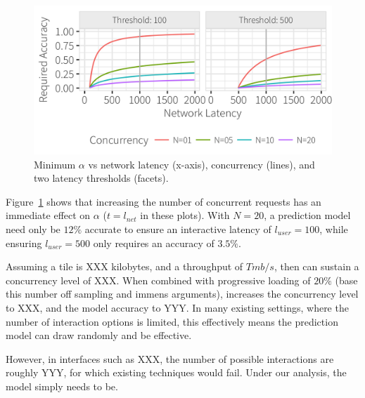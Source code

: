 \begin{figure}[h]
	\centering
	\includegraphics[width=1\columnwidth]{figures/model_concurrency}
 	\caption{Minimum $\alpha$ vs network latency (x-axis), concurrency (lines), and two latency thresholds (facets).}
  \label{fig:model_concurrency}
\end{figure}


Figure~\ref{fig:model_concurrency} shows that increasing the number of concurrent requests has an immediate effect on $\alpha$ ($t=l_{net}$ in these plots).    With $N=20$, a prediction model need only be $12\%$ accurate to ensure an interactive latency of $l_{user}=100$, while ensuring  $l_{user}=500$ only requires an accuracy of $3.5\%$. 





Assuming a tile is XXX kilobytes, and a throughput of $T mb/s$, then can sustain a concurrency level of XXX.  
When combined with progressive loading of $20\%$ (base this number off sampling and immens arguments), increases the concurrency level to XXX, 
and the model accuracy to YYY.  In many existing settings, where the number of interaction options is limited, this effectively means the prediction model
can draw randomly and be effective.  

However, in interfaces such as XXX, the number of possible interactions are roughly YYY, for which existing techniques would fail.  Under our analysis, the model simply needs to be.


